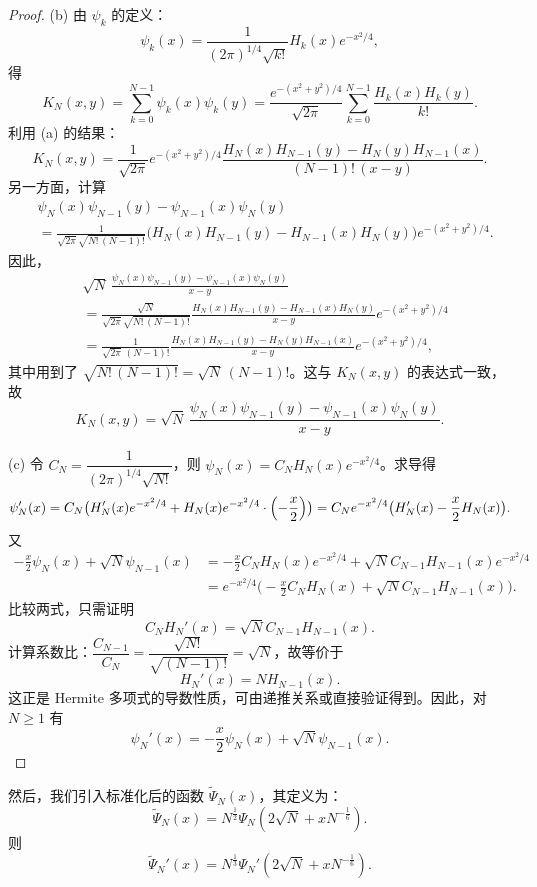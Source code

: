 \begin{proof}
(b)
由 $\psi_k$ 的定义：
\[
\psi_k(x) = \frac{1}{(2\pi)^{1/4}\sqrt{k!}} H_k(x) e^{-x^2/4},
\]
得
\[
K_N(x,y) = \sum_{k=0}^{N-1} \psi_k(x)\psi_k(y) = \frac{e^{-(x^2+y^2)/4}}{\sqrt{2\pi}} \sum_{k=0}^{N-1} \frac{H_k(x)H_k(y)}{k!}.
\]
利用 (a) 的结果：
\[
K_N(x,y) = \frac{1}{\sqrt{2\pi}} e^{-(x^2+y^2)/4} \frac{H_N(x)H_{N-1}(y) - H_N(y)H_{N-1}(x)}{(N-1)!\,(x-y)}.
\]
另一方面，计算
\begin{equation*}
    \begin{aligned}
        &\psi_N(x)\psi_{N-1}(y) - \psi_{N-1}(x)\psi_N(y) \\&= \frac{1}{\sqrt{2\pi}\sqrt{N!\,(N-1)!}} \bigl(H_N(x)H_{N-1}(y) - H_{N-1}(x)H_N(y)\bigr) e^{-(x^2+y^2)/4}.
    \end{aligned}
\end{equation*}
因此，
\begin{align*}
&\sqrt{N}\,\frac{\psi_N(x)\psi_{N-1}(y) - \psi_{N-1}(x)\psi_N(y)}{x-y} \\&= \frac{\sqrt{N}}{\sqrt{2\pi}\sqrt{N!\,(N-1)!}} \frac{H_N(x)H_{N-1}(y) - H_{N-1}(x)H_N(y)}{x-y} e^{-(x^2+y^2)/4} \\
&= \frac{1}{\sqrt{2\pi}\,(N-1)!} \frac{H_N(x)H_{N-1}(y) - H_N(y)H_{N-1}(x)}{x-y} e^{-(x^2+y^2)/4},
\end{align*}
其中用到了 $\sqrt{N!\,(N-1)!} = \sqrt{N}\,(N-1)!$。这与 $K_N(x,y)$ 的表达式一致，故
\[
K_N(x,y) = \sqrt{N}\,\frac{\psi_N(x)\psi_{N-1}(y) - \psi_{N-1}(x)\psi_N(y)}{x-y}.
\]


(c)
令 $C_N = \dfrac{1}{(2\pi)^{1/4}\sqrt{N!}}$，则 $\psi_N(x) = C_N H_N(x) e^{-x^2/4}$。求导得
\[
\psi_N'(x) = C_N \bigl( H_N'(x) e^{-x^2/4} + H_N(x) e^{-x^2/4} \cdot \Bigl(-\frac{x}{2}\Bigr) \bigr) = C_N e^{-x^2/4} \bigl( H_N'(x) - \frac{x}{2} H_N(x) \bigr).
\]
又
\begin{align*}
-\frac{x}{2} \psi_N(x) + \sqrt{N} \psi_{N-1}(x) &= -\frac{x}{2} C_N H_N(x) e^{-x^2/4} + \sqrt{N} C_{N-1} H_{N-1}(x) e^{-x^2/4} \\
&= e^{-x^2/4} \bigl( -\frac{x}{2} C_N H_N(x) + \sqrt{N} C_{N-1} H_{N-1}(x) \bigr).
\end{align*}
比较两式，只需证明
\[
C_N H_N'(x) = \sqrt{N} C_{N-1} H_{N-1}(x).
\]
计算系数比：$\dfrac{C_{N-1}}{C_N} = \dfrac{\sqrt{N!}}{\sqrt{(N-1)!}} = \sqrt{N}$，故等价于
\[
H_N'(x) = N H_{N-1}(x).
\]
这正是 Hermite 多项式的导数性质，可由递推关系或直接验证得到。因此，对 $N \geq 1$ 有
\[
\psi_N'(x) = -\frac{x}{2} \psi_N(x) + \sqrt{N} \psi_{N-1}(x).
\]
\end{proof}

然后，我们引入标准化后的函数 \(\tilde{\Psi}_N(x)\)，其定义为：
\[
\tilde{\Psi}_{N}(x) = N^{\frac{1}{2}} \Psi_{N}(2\sqrt{N} + x N^{-\frac{1}{6}}).
\]
则
\[
\tilde{\Psi}_{N}'(x) = N^{\frac{1}{3}}  \Psi_{N}'(2\sqrt{N} + x N^{-\frac{1}{6}}).
\]

